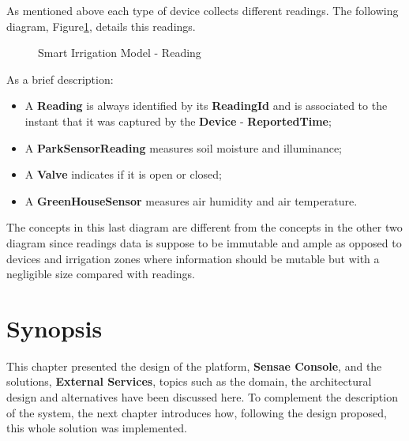 As mentioned above each type of device collects different readings. The following diagram, Figure\ref{fig:design:domain:bounded_contexts:irrigation:diagram:reading}, details this readings.

\begin{figure}[H]
   \centering
  \resizebox{\columnwidth}{!}
  {
     
  }
  \caption[Smart Irrigation Model - Reading]{Smart Irrigation Model - Reading}
  \label{fig:design:domain:bounded_contexts:irrigation:diagram:reading}
\end{figure}

As a brief description:

\begin{itemize}
   \item A \textbf{Reading} is always identified by its \textbf{ReadingId} and is associated to the instant that it was captured by the \textbf{Device} - \textbf{ReportedTime};
   \item A \textbf{ParkSensorReading} measures soil moisture and illuminance;
   \item A \textbf{Valve} indicates if it is open or closed;
   \item A \textbf{GreenHouseSensor} measures air humidity and air temperature.
\end{itemize}

The concepts in this last diagram are different from the concepts in the other two diagram since readings data is suppose to be immutable and ample as opposed to devices and irrigation zones where information should be mutable but with a negligible size compared with readings.
\section{Synopsis}
\label{sec:design:synopsis}

This chapter presented the design of the platform, \textbf{Sensae Console}, and the solutions, \textbf{External Services}, topics such as the domain, the architectural design and alternatives have been discussed here. To complement the description of the system, the next chapter introduces how, following the design proposed, this whole solution was implemented.
